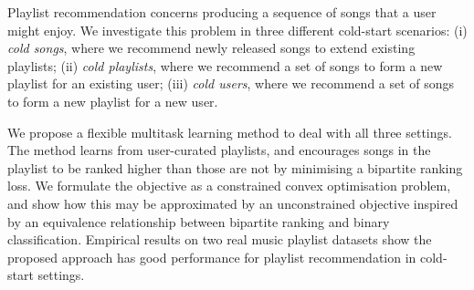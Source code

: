 
Playlist recommendation concerns producing a sequence of songs that a user might enjoy.
We investigate this problem in three different cold-start scenarios:
(i) \emph{cold songs}, where we recommend newly released songs to extend existing playlists;
(ii) \emph{cold playlists}, where we recommend a set of songs to form a new playlist for an existing user; %
(iii) \emph{cold users}, where we recommend a set of songs to form a new playlist for a new user. %

We propose a flexible multitask learning method to deal with all three settings.
The method learns from user-curated playlists,
and encourages songs in the playlist 
to be ranked higher than those are not
by minimising a %
bipartite ranking loss.
We formulate the objective as a constrained convex optimisation problem,
and show how this may be approximated by an unconstrained objective
inspired by an equivalence relationship between bipartite ranking and binary classification.
Empirical results on two real music playlist datasets show the proposed approach has good performance for playlist recommendation
in cold-start settings.
